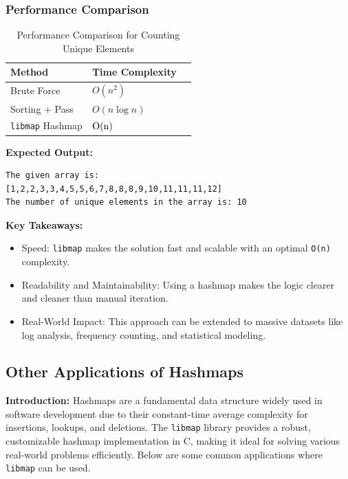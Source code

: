 \documentclass[titlepage]{article}
\begin{document}
\subsubsection{Performance Comparison}
\begin{table}[h]
    \centering
    \renewcommand{\arraystretch}{1.3}
    \begin{tabular}{@{} l l l @{}}
        \toprule
        \textbf{Method} & \textbf{Time Complexity} \\
        \midrule
        Brute Force & \(O(n^2)\)\\
        Sorting + Pass & \(O(n \log n)\) \\
        \texttt{libmap} Hashmap & \($O(n)$\) \\
        \bottomrule
    \end{tabular}
    \caption{Performance Comparison for Counting Unique Elements}
\end{table}

\textbf{Expected Output:}
\begin{verbatim}
The given array is:
[1,2,2,3,3,4,5,5,6,7,8,8,8,9,10,11,11,11,12]
The number of unique elements in the array is: 10
\end{verbatim}

\textbf{Key Takeaways:}
\begin{itemize}
    \item Speed: \texttt{libmap} makes the solution fast and scalable with an optimal \texttt{O(n)} complexity.
    \item Readability and Maintainability: Using a hashmap makes the logic clearer and cleaner than manual iteration.
    \item Real-World Impact: This approach can be extended to massive datasets like log analysis, frequency counting, and statistical modeling.
\end{itemize}

\subsection{Other Applications of Hashmaps}

\textbf{Introduction:}
Hashmaps are a fundamental data structure widely used in software development due to their constant-time average complexity for insertions, lookups, and deletions. The \texttt{libmap} library provides a robust, customizable hashmap implementation in C, making it ideal for solving various real-world problems efficiently. Below are some common applications where \texttt{libmap} can be used.
\end{document}
